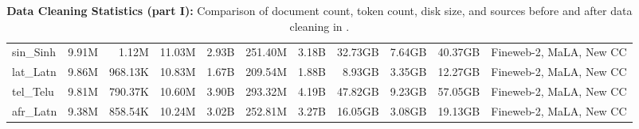 \begin{table*}[!htp]
{\begin{tabular}{l|rrr|rrr|rrr|l}
sin\_Sinh                   & 9.91M      & 1.12M        & 11.03M      & 2.93B        & 251.40M        & 3.18B         & 32.73GB    & 7.64GB       & 40.37GB     & Fineweb-2, MaLA, New CC \\
lat\_Latn                   & 9.86M      & 968.13K      & 10.83M      & 1.67B        & 209.54M        & 1.88B         & 8.93GB     & 3.35GB       & 12.27GB     & Fineweb-2, MaLA, New CC \\
tel\_Telu                   & 9.81M      & 790.37K      & 10.60M      & 3.90B        & 293.32M        & 4.19B         & 47.82GB    & 9.23GB       & 57.05GB     & Fineweb-2, MaLA, New CC \\
afr\_Latn                   & 9.38M      & 858.54K      & 10.24M      & 3.02B        & 252.81M        & 3.27B         & 16.05GB    & 3.08GB       & 19.13GB     & Fineweb-2, MaLA, New CC \\
\bottomrule
\end{tabular}}
\caption{
\label{tab_app:data_clean_1}
\textbf{Data Cleaning Statistics (part I):} Comparison of document count, token count, disk size, and sources before and after data cleaning  in \dcad.
}
\end{table*}


